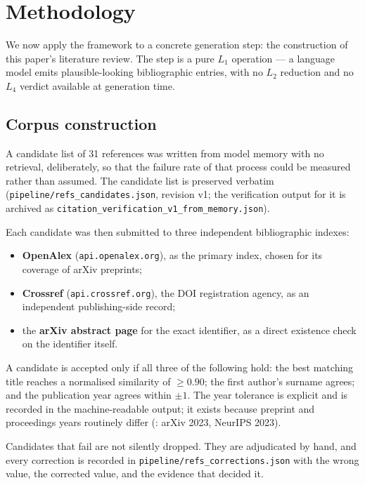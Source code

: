 \documentclass[11pt,a4paper]{article}
\begin{document}
\section{Methodology}
\label{sec:method}

We now apply the framework to a concrete generation step: the construction of
this paper's literature review. The step is a pure $L_1$ operation --- a
language model emits plausible-looking bibliographic entries, with no $L_2$
reduction and no $L_4$ verdict available at generation time.

\subsection{Corpus construction}

A candidate list of 31 references was written from model memory with no
retrieval, deliberately, so that the failure rate of that process could be
measured rather than assumed. The candidate list is preserved verbatim
(\texttt{pipeline/refs\_candidates.json}, revision v1; the verification output
for it is archived as \texttt{citation\_verification\_v1\_from\_memory.json}).

Each candidate was then submitted to three independent bibliographic indexes:

\begin{itemize}[leftmargin=*,itemsep=2pt]
  \item \textbf{OpenAlex} (\texttt{api.openalex.org}), as the primary index,
  chosen for its coverage of arXiv preprints;
  \item \textbf{Crossref} (\texttt{api.crossref.org}), the DOI registration
  agency, as an independent publishing-side record;
  \item the \textbf{arXiv abstract page} for the exact identifier, as a
  direct existence check on the identifier itself.
\end{itemize}

A candidate is accepted only if all three of the following hold: the best
matching title reaches a normalised similarity of $\geq 0.90$; the first
author's surname agrees; and the publication year agrees within $\pm 1$. The
year tolerance is explicit and is recorded in the machine-readable output; it
exists because preprint and proceedings years routinely differ
(\citealp{yang2023leandojo}: arXiv 2023, NeurIPS 2023).

Candidates that fail are not silently dropped. They are adjudicated by hand,
and every correction is recorded in \texttt{pipeline/refs\_corrections.json}
with the wrong value, the corrected value, and the evidence that decided it.
\end{document}
